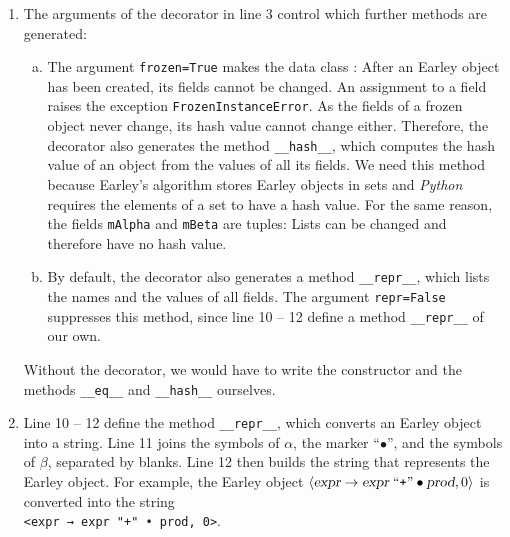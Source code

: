 \begin{enumerate}
\begin{enumerate}[(a)]
            \texttt{EarleyObject('expr', ('expr', '"+"'), ('prod',), 0)}
            \\[0.2cm]
            creates the Earley object
            $\pair(\textsl{expr} \rightarrow \textsl{expr} \;\squoted{+} \mdot \textsl{prod}, 0)$.
      \item The method \texttt{\_\_eq\_\_} compares two objects field by field:  Two Earley objects are equal if and
            only if they agree in all four fields.  \textsl{Python} derives the operator \texttt{!=} from the method
            \texttt{\_\_eq\_\_}, so \texttt{\_\_ne\_\_} need not be defined.
      \end{enumerate}
\item The arguments of the decorator in line 3 control which further methods are generated:
      \begin{enumerate}[(a)]
      \item The argument \texttt{frozen=True} makes the data class
            :  After an Earley object has been created, its fields cannot be
            changed.  An assignment to a field raises the exception \texttt{FrozenInstanceError}.  As the fields of
            a frozen object never change, its hash value cannot change either.  Therefore, the decorator also
            generates the method \texttt{\_\_hash\_\_}, which computes the hash value of an object from the values of
            all its fields.  We need this method because Earley's algorithm stores Earley objects in sets and
            \textsl{Python} requires the elements of a set to have a hash value.  For the same reason, the fields
            \texttt{mAlpha} and \texttt{mBeta} are tuples:  Lists can be changed and therefore have no hash value.
      \item By default, the decorator also generates a method \texttt{\_\_repr\_\_}, which lists the names and the
            values of all fields.  The argument \texttt{repr=False} suppresses this method, since line 10 -- 12
            define a method \texttt{\_\_repr\_\_} of our own.
      \end{enumerate}
      Without the decorator, we would have to write the constructor and the methods \texttt{\_\_eq\_\_} and
      \texttt{\_\_hash\_\_} ourselves.
\item Line 10 -- 12 define the method \texttt{\_\_repr\_\_}, which converts an Earley object into a string.
      Line 11 joins the symbols of $\alpha$, the marker ``$\bullet$'', and the symbols of $\beta$, separated by
      blanks.  Line 12 then builds the string that represents the Earley object.  For example, the Earley object
      $\pair(\textsl{expr} \rightarrow \textsl{expr} \;\squoted{+} \mdot \textsl{prod}, 0)$
      is converted into the string
      \\[0.2cm]
      \hspace*{1.3cm}
      \texttt{<expr → expr "+" • prod, 0>}.
\end{enumerate}

